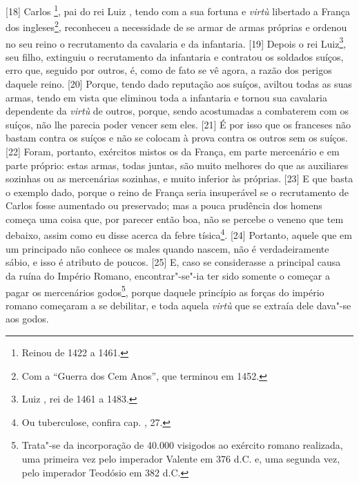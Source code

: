 {[}18{]} Carlos \footnote{Reinou de 1422 a 1461.}, pai do rei Luiz
, tendo com a sua fortuna e \emph{virtù} libertado a França dos
ingleses\footnote{Com a ``Guerra dos Cem Anos'', que terminou em 1452.},
reconheceu a necessidade de se armar de armas próprias e ordenou no seu
reino o recrutamento da cavalaria e da infantaria. {[}19{]} Depois o rei
Luiz\footnote{Luiz , rei de 1461 a 1483.}, seu filho, extinguiu o
recrutamento da infantaria e contratou os soldados suíços, erro que,
seguido por outros, é, como de fato se vê agora, a razão dos perigos
daquele reino. {[}20{]} Porque, tendo dado reputação aos suíços, aviltou
todas as suas armas, tendo em vista que eliminou toda a infantaria e
tornou sua cavalaria dependente da \emph{virtù} de outros, porque, sendo
acostumadas a combaterem com os suíços, não lhe parecia poder vencer sem
eles. {[}21{]} É por isso que os franceses não bastam contra os suíços e
não se colocam à prova contra os outros sem os suíços. {[}22{]} Foram,
portanto, exércitos mistos os da França, em parte mercenário e em parte
próprio: estas armas, todas juntas, são muito melhores do que as
auxiliares sozinhas ou as mercenárias sozinhas, e muito inferior às
próprias. {[}23{]} E que basta o exemplo dado, porque o reino de França
seria insuperável se o recrutamento de Carlos fosse aumentado ou
preservado; mas a pouca prudência dos homens começa uma coisa que, por
parecer então boa, não se percebe o veneno que tem debaixo, assim como
eu disse acerca da febre tísica\footnote{Ou tuberculose, confira cap.
  , 27.}. {[}24{]} Portanto, aquele que em um principado não conhece
os males quando nascem, não é verdadeiramente sábio, e isso é atributo
de poucos. {[}25{]} E, caso se considerasse a principal causa da ruína
do Império Romano, encontrar"-se"-ia ter sido somente o começar a pagar os
mercenários godos\footnote{Trata"-se da incorporação de 40.000 visigodos
  ao exército romano realizada, uma primeira vez pelo imperador Valente
  em 376 d.C. e, uma segunda vez, pelo imperador Teodósio em 382 d.C.},
porque daquele princípio as forças do império romano começaram a se
debilitar, e toda aquela \emph{virtù} que se extraía dele dava"-se aos
godos.

\quebra

